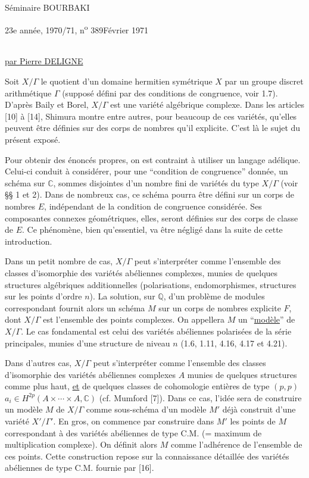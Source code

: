 \documentclass[10pt]{article}
\newcommand{\C}{\mathbb C}
\newcommand{\Q}{\mathbb Q}
\begin{document}
\noindent Séminaire BOURBAKI\par
\noindent 23e année, 1970/71, n\textsuperscript{o} 389\hfill Février 1971\par\vspace{2.2em}
\begingroup
\renewcommand{\thefootnote}{(*)}
\begin{center}
{\Large\bfseries {}}\\[1.2em]
\uline{par Pierre DELIGNE}
\end{center}
\endgroup

Soit $X/\Gamma$ le quotient d'un domaine hermitien symétrique $X$ par un groupe discret arithmétique $\Gamma$ (supposé défini par des conditions de congruence, voir 1.7). D'après Baily et Borel, $X/\Gamma$ est une variété algébrique complexe. Dans les articles [10] à [14], Shimura montre entre autres, pour beaucoup de ces variétés, qu'elles peuvent être définies sur des corps de nombres qu'il explicite. C'est là le sujet du présent exposé.

Pour obtenir des énoncés propres, on est contraint à utiliser un langage adélique. Celui-ci conduit à considérer, pour une ``condition de congruence'' donnée, un schéma sur $\C$, sommes disjointes d'un nombre fini de variétés du type $X/\Gamma$ (voir §§ 1 et 2). Dans de nombreux cas, ce schéma pourra être défini sur un corps de nombres $E$, indépendant de la condition de congruence considérée. Ses composantes connexes géométriques, elles, seront définies sur des corps de classe de $E$. Ce phénomène, bien qu'essentiel, va être négligé dans la suite de cette introduction.

Dans un petit nombre de cas, $X/\Gamma$ peut s'interpréter comme l'ensemble des classes d'isomorphie des variétés abéliennes complexes, munies de quelques structures algébriques additionnelles (polarisations, endomorphismes, structures sur les points d'ordre $n$). La solution, sur $\Q$, d'un problème de modules correspondant fournit alors un schéma $M$ sur un corps de nombres explicite $F$, dont $X/\Gamma$ est l'ensemble des points complexes. On appellera $M$ un ``\uline{modèle}'' de $X/\Gamma$. Le cas fondamental est celui des variétés abéliennes polarisées de la série principales, munies d'une structure de niveau $n$ (1.6, 1.11, 4.16, 4.17 et 4.21).

Dans d'autres cas, $X/\Gamma$ peut s'interpréter comme l'ensemble des classes d'isomorphie des variétés abéliennes complexes $A$ munies de quelques structures comme plus haut, \uline{et} de quelques classes de cohomologie entières de type $(p,p)$ $a_i\in H^{2p}(A\times\cdots\times A,\C)$ (cf. Mumford [7]). Dans ce cas, l'idée sera de construire un modèle $M$ de $X/\Gamma$ comme sous-schéma d'un modèle $M'$ déjà construit d'une variété $X'/\Gamma'$. En gros, on commence par construire dans $M'$ les points de $M$ correspondant à des variétés abéliennes de type C.M. (= maximum de multiplication complexe). On définit alors $M$ comme l'adhérence de l'ensemble de ces points. Cette construction repose sur la connaissance détaillée des variétés abéliennes de type C.M. fournie par [16].
\end{document}
